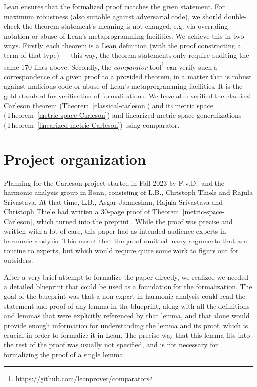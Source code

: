 \documentclass[12pt]{amsart}
\theoremstyle{definition}
\theoremstyle{plain}
\begin{document}
Lean ensures that the formalized proof matches the given statement.
For maximum robustness (also suitable against adversarial code), we should double-check the theorem statement's meaning is not changed, e.g. via overriding notation or abuse of Lean's metaprogramming facilities. We achieve this in two ways. Firstly, each theorem is a Lean definition (with the proof constructing a term of that type) --- this way, the theorem statements only require auditing the same 170 lines above.
Secondly, the \emph{comparator} tool\footnote{\url{https://github.com/leanprover/comparator}} can verify such a correspondence of a given proof to a provided theorem, in a matter that is robust against malicious code or abuse of Lean's metaprogramming facilities. It is the gold standard for verification of formalisations.
We have also verified the classical Carleson theorem (Theorem~\ref{classical-carleson}) and its metric space (Theorem~\ref{metric-space-Carleson}) and linearized metric space generalizations (Theorem~\ref{linearized-metric-Carleson}) using comparator. %

\section{Project organization}\label{sec:org}

Planning for the Carleson project started in Fall 2023 by
F.v.D.\ and the harmonic analysis group in Bonn,
consisting of L.B., Christoph Thiele and Rajula Srivastava.
At that time, L.B., Asgar Jamneshan, Rajula Srivastava and Christoph Thiele had written a 30-page proof of Theorem~\ref{metric-space-Carleson}, which turned into the preprint \cite{ThieleCarlesonPreprint}.
While the proof was precise and written with a lot of care,
this paper had as intended audience experts in harmonic analysis.
This meant that the proof omitted many arguments that are routine to experts,
but which would require quite some work to figure out for outsiders.

After a very brief attempt to formalize the paper directly,
we realized we needed a detailed blueprint that could be used as a foundation for the formalization.
The goal of the blueprint was that a non-expert in harmonic analysis
could read the statement and proof of any lemma in the blueprint,
along with all the definitions and lemmas that were explicitly referenced by that lemma,
and that alone would provide enough information for understanding the lemma and its proof, which is crucial in order to formalize it in Lean.
The precise way that this lemma fits into the rest of the proof was usually not specified,
and is not necessary for formalizing the proof of a single lemma.
\end{document}
